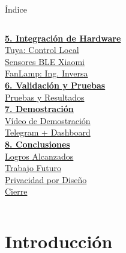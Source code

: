 {\begin{frame}{Índice}
\begin{columns}[T]
    \hyperlink{s:tuya}{\normalsize\textbf{5. Integración de Hardware}}\\
    \hspace{0.45cm}\color{darkgray}\hyperlink{s:tuya}{Tuya: Control Local}\\
    \hspace{0.45cm}\color{darkgray}\hyperlink{s:xiaomi}{Sensores BLE Xiaomi}\\
    \hspace{0.45cm}\color{darkgray}\hyperlink{s:fanlamp}{FanLamp: Ing. Inversa}\\[0.25cm]

    \hyperlink{s:validacion}{\normalsize\textbf{6. Validación y Pruebas}}\\
    \hspace{0.45cm}\color{darkgray}\hyperlink{s:validacion}{Pruebas y Resultados}\\[0.25cm]

    \hyperlink{s:democontenido}{\normalsize\textbf{7. Demostración}}\\
    \hspace{0.45cm}\color{darkgray}\hyperlink{s:democontenido}{Vídeo de Demostración}\\
    \hspace{0.45cm}\color{darkgray}\hyperlink{s:telegram}{Telegram + Dashboard}\\[0.25cm]

    \hyperlink{s:logros}{\normalsize\textbf{8. Conclusiones}}\\
    \hspace{0.45cm}\color{darkgray}\hyperlink{s:logros}{Logros Alcanzados}\\
    \hspace{0.45cm}\color{darkgray}\hyperlink{s:futuro}{Trabajo Futuro}\\
    \hspace{0.45cm}\color{darkgray}\hyperlink{s:privacidad}{Privacidad por Diseño}\\
    \hspace{0.45cm}\color{darkgray}\hyperlink{s:cierre}{Cierre}
  \end{columns}
\end{frame}
}

\section{Introducción}

